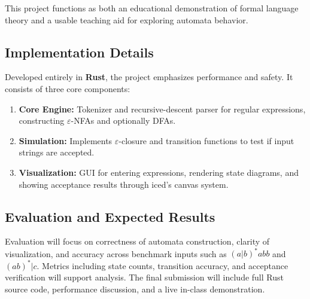 \documentclass[00_project_proposal.tex]{subfiles}
\begin{document}
This project functions as both an educational demonstration of formal language theory and a usable teaching aid for exploring automata behavior.

\subsection{Implementation Details}

Developed entirely in \textbf{Rust}, the project emphasizes performance and safety.
It consists of three core components:
\begin{enumerate}
    \item \textbf{Core Engine:} Tokenizer and recursive-descent parser for regular expressions, constructing $\varepsilon$-NFAs and optionally DFAs.
    \item \textbf{Simulation:} Implements $\varepsilon$-closure and transition functions to test if input strings are accepted.
    \item \textbf{Visualization:} GUI for entering expressions, rendering state diagrams, and showing acceptance results through iced's canvas system.
\end{enumerate}

\subsection{Evaluation and Expected Results}

Evaluation will focus on correctness of automata construction, clarity of visualization, and accuracy across benchmark inputs such as $(a|b)^*abb$ and $(ab)^*|c$.
Metrics including state counts, transition accuracy, and acceptance verification will support analysis.
The final submission will include full Rust source code, performance discussion, and a live in-class demonstration.

\clearpage
\end{document}
